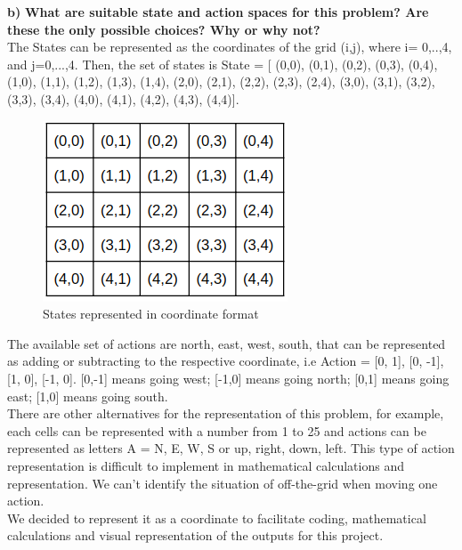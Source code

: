 \documentclass[11pt]{article}
\begin{document}
\noindent
\textbf{b)}
\noindent
\textbf{What are suitable state and action spaces for this problem? Are
these the only possible choices? Why or why not?}
\\

\noindent
The States can be represented as the coordinates of the grid (i,j), where i=
0,..,4, and j=0,...,4. Then, the set of states is State = {[ (0,0), (0,1),
(0,2), (0,3), (0,4), (1,0), (1,1), (1,2), (1,3), (1,4), (2,0), (2,1), (2,2),
(2,3), (2,4), (3,0), (3,1), (3,2), (3,3), (3,4), (4,0), (4,1), (4,2), (4,3),
(4,4)]}.
\\

\begin{figure}[h]
\includegraphics[scale=0.5]{states}
\centering
\caption{States represented in coordinate format}
\end{figure}

\noindent
The available set of actions are north, east, west, south, that can be
represented as adding or subtracting to the respective coordinate, i.e Action =
{[0, 1], [0, -1], [1, 0], [-1, 0]}. [0,-1] means going west; [-1,0] means going
north; [0,1] means going east; [1,0] means going south.
\\

\noindent
There are other alternatives for the representation of this problem, for
example, each cells can be represented with a number from 1 to 25 and actions
can be represented as letters A = {N, E, W, S} or {up, right, down, left}. This
type of action representation is difficult to implement in mathematical
calculations and representation. We can’t identify the situation of off-the-grid
when moving one action.
\\

\noindent
We decided to represent it as a coordinate to facilitate coding, mathematical
calculations and visual representation of the outputs for this project. 
\\
\end{document}

